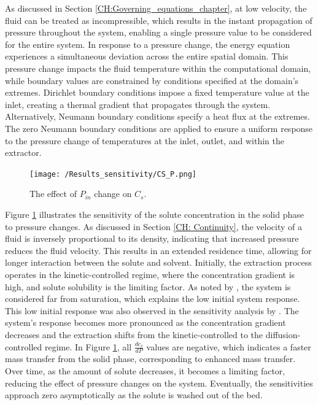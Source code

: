 \documentclass[a4paper,fleqn]{cas-dc}
\begin{document}
	As discussed in Section \ref{CH:Governing_equations_chapter}, at low velocity, the fluid can be treated as incompressible, which results in the instant propagation of pressure throughout the system, enabling a single pressure value to be considered for the entire system. In response to a pressure change, the energy equation experiences a simultaneous deviation across the entire spatial domain. This pressure change impacts the fluid temperature within the computational domain, while boundary values are constrained by conditions specified at the domain's extremes. Dirichlet boundary conditions impose a fixed temperature value at the inlet, creating a thermal gradient that propagates through the system. Alternatively,  Neumann boundary conditions specify a heat flux at the extremes. The zero Neumann boundary conditions are applied to ensure a uniform response to the pressure change of temperatures at the inlet, outlet, and within the extractor.
		
	\begin{figure}[!ht]
		\centering
		\texttt{[image: /Results\_sensitivity/CS\_P.png]}
		\caption{The effect of $P_{in}$ change on $C_s$.}
		\label{fig:Sensitivty_P_CS}
	\end{figure}
	
	Figure \ref{fig:Sensitivty_P_CS} illustrates the sensitivity of the solute concentration in the solid phase to pressure changes. As discussed in Section \ref{CH: Continuity}, the velocity of a fluid is inversely proportional to its density, indicating that increased pressure reduces the fluid velocity. This results in an extended residence time, allowing for longer interaction between the solute and solvent.	Initially, the extraction process operates in the kinetic-controlled regime, where the concentration gradient is high, and solute solubility is the limiting factor. As noted by \citet{Sliczniuk2024}, the system is considered far from saturation, which explains the low initial system response. This low initial response was also observed in the sensitivity analysis by \citet{Fiori_2007}. The system's response becomes more pronounced as the concentration gradient decreases and the extraction shifts from the kinetic-controlled to the diffusion-controlled regime. In Figure \ref{fig:Sensitivty_P_CS}, all $\frac{dc_s}{dP}$ values are negative, which indicates a faster mass transfer from the solid phase, corresponding to enhanced mass transfer.  Over time, as the amount of solute decreases, it becomes a limiting factor, reducing the effect of pressure changes on the system. Eventually, the sensitivities approach zero asymptotically as the solute is washed out of the bed.
	
\end{document}
